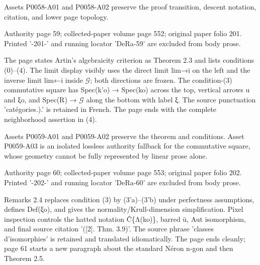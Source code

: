 \documentclass[11pt,a4paper]{article}
\begin{document}
Assets P0058-A01 and P0058-A02 preserve the proof transition, descent notation, citation, and lower page topology.


\par\medskip
\hypertarget{D018-P0059}{}
\par\smallskip
Authority page 59; collected-paper volume page 552; original paper folio 201. Printed '-201-' and running locator 'DeRa-59' are excluded from body prose.

The page states Artin's algebraicity criterion as Theorem 2.3 and lists conditions (0)--(4). The limit display visibly uses the direct limit lim→\textunderscore{}i on the left and the inverse limit lim←\textunderscore{}i inside \ensuremath{\mathcal{G}}; both directions are frozen. The condition-(3) commutative square has Spec(k'\textunderscore{}o) → Spec(k\textunderscore{}o) across the top, vertical arrows u and ξ\textunderscore{}o, and Spec(R) → \ensuremath{\mathcal{G}} along the bottom with label ξ. The source punctuation 'catégories.).' is retained in French. The page ends with the complete neighborhood assertion in (4).

Assets P0059-A01 and P0059-A02 preserve the theorem and conditions. Asset P0059-A03 is an isolated lossless authority fallback for the commutative square, whose geometry cannot be fully represented by linear prose alone.


\par\medskip
\hypertarget{D018-P0060}{}
\par\smallskip
Authority page 60; collected-paper volume page 553; original paper folio 202. Printed '-202-' and running locator 'DeRa-60' are excluded from body prose.

Remarks 2.4 replaces condition (3) by (3'a)--(3'b) under perfectness assumptions, defines Def(ξ\textunderscore{}o), and gives the normality/Krull-dimension simplification. Pixel inspection controls the hatted notation Ĉ\textunderscore{}\{Λ(k\textunderscore{}o)\}, barred ū, Aut isomorphism, and final source citation '([2]. Thm. 3.9)'. The source phrase 'classes d'isomorphies' is retained and translated idiomatically. The page ends cleanly; page 61 starts a new paragraph about the standard Néron n-gon and then Theorem 2.5.
\end{document}
